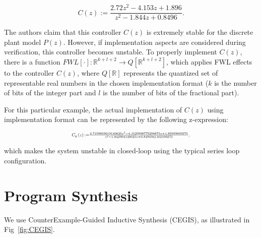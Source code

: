 \documentclass{sig-alternate-05-2015}
\begin{document}
\begin{equation}
\label{Eq:running-example-controller}
C\left(z\right) := \frac{2.72z^2 - 4.153z + 1.896}{z^2 - 1.844z + 0.8496}.
\end{equation}

The authors claim that this controller $C(z)$ is extremely stable for the discrete plant model $P(z)$. However, if implementation aspects are considered during verification, this controller becomes unstable. To properly implement $C(z)$, there is a function $FWL[\cdot]:\mathbb{R}^{k+l+2}\rightarrow Q[\mathbb{R}^{k+l+2}]$, which applies FWL effects to the controller $C(z)$, where $Q[\mathbb{R}]$ represents the quantized set of representable real numbers in the chosen implementation format 
 ($k$ is the number of bits of the integer part and $l$ is the number of bits of the fractional part). 

For this particular example, the actual implementation of $C(z)$ using  implementation format can be represented by the following z-expression:

\begin{equation}
\label{Eq:running-example-controller-quantized}
\resizebox{0.5\textwidth}{!}{
$C_{q}\left(z\right) {:=} \frac{2.7199859619140625z^2 - 4.1529998779296875z + 1.89599609375}{z^2 - 1.843994140625z + 0.8495941162109375},$
}
\end{equation} 

\noindent which makes the system unstable in closed-loop using the typical series loop configuration.

\section{Program Synthesis}

We use CounterExample-Guided Inductive Synthesis (CEGIS), as
illustrated in Fig~\ref{fig:CEGIS}.
\end{document}

